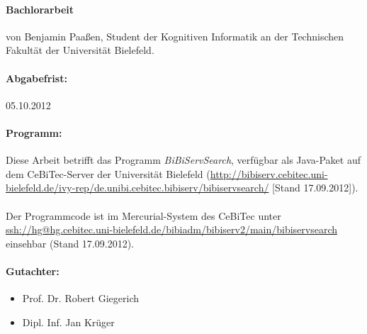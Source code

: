 \documentclass{book}
\begin{document}


\paragraph{Bachlorarbeit} von Benjamin Paaßen, Student der Kognitiven Informatik an der Technischen Fakultät der Universität Bielefeld.

\paragraph{Abgabefrist:} 05.10.2012

\paragraph{Programm:} Diese Arbeit betrifft das Programm \textit{BiBiServSearch}, verfügbar als Java\texttrademark-Paket auf dem CeBiTec-Server der Universität Bielefeld (\url{http://bibiserv.cebitec.uni-bielefeld.de/ivy-rep/de.unibi.cebitec.bibiserv/bibiservsearch/} [Stand 17.09.2012]).
\paragraph{} Der Programmcode ist im Mercurial\texttrademark-System des CeBiTec unter \url{ssh://hg@hg.cebitec.uni-bielefeld.de/bibiadm/bibiserv2/main/bibiservsearch} einsehbar (Stand 17.09.2012).

\paragraph{Gutachter:}

\begin{itemize}
 \item[] Prof. Dr. Robert Giegerich
 \item[] Dipl. Inf. Jan Krüger
\end{itemize}

\tableofcontents








\end{document}
